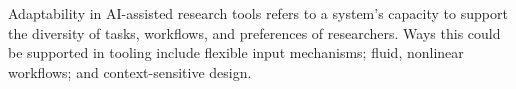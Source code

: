     
    


Adaptability in AI-assisted research tools refers to a system’s capacity to support the diversity of tasks, workflows, and preferences of researchers. Ways this could be supported in tooling include flexible input mechanisms; fluid, nonlinear workflows; and context-sensitive design.

